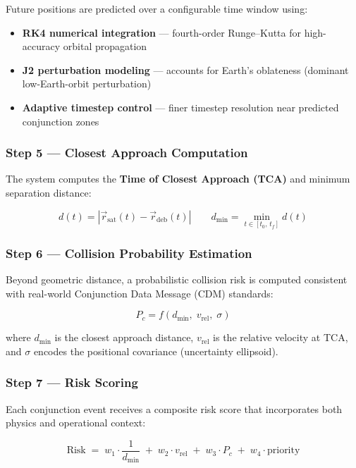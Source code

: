 \documentclass[11pt, a4paper]{article}
\newcommand{\keyword}[1]{\textcolor{orbitcyan}{\textbf{#1}}}
\begin{document}
Future positions are predicted over a configurable time window using:

\begin{itemize}[leftmargin=1.5cm]
  \item \textbf{RK4 numerical integration} --- fourth-order Runge--Kutta for high-accuracy orbital propagation
  \item \textbf{J2 perturbation modeling} --- accounts for Earth's oblateness (dominant low-Earth-orbit perturbation)
  \item \textbf{Adaptive timestep control} --- finer timestep resolution near predicted conjunction zones
\end{itemize}

\subsubsection{Step 5 --- Closest Approach Computation}

The system computes the \keyword{Time of Closest Approach (TCA)} and minimum separation distance:

\[
  d(t) = \left|\vec{r}_{\text{sat}}(t) - \vec{r}_{\text{deb}}(t)\right|
  \qquad
  d_{\min} = \min_{t \in [t_0,\, t_f]} d(t)
\]

\subsubsection{Step 6 --- Collision Probability Estimation}

Beyond geometric distance, a probabilistic collision risk is computed consistent with real-world
Conjunction Data Message (CDM) standards:

\[
  P_c = f\!\left(d_{\min},\; v_{\text{rel}},\; \sigma\right)
\]

where $d_{\min}$ is the closest approach distance, $v_{\text{rel}}$ is the relative velocity at
TCA, and $\sigma$ encodes the positional covariance (uncertainty ellipsoid).

\subsubsection{Step 7 --- Risk Scoring}

Each conjunction event receives a composite risk score that incorporates both physics and
operational context:

\[
  \text{Risk} \;=\;
  w_1 \cdot \frac{1}{d_{\min}}
  \;+\; w_2 \cdot v_{\text{rel}}
  \;+\; w_3 \cdot P_c
  \;+\; w_4 \cdot \text{priority}
\]
\end{document}
